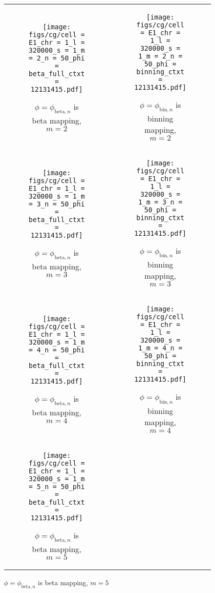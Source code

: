 \documentclass{article}
\def\bin{\text{bin}}
\def\bet{\text{beta}}
\begin{document}
\begin{figure}[H]
    \begin{tabular}{cc}
    \begin{subfigure}[t]{0.4\textwidth}
      \texttt{[image: figs/cg/cell = E1\_chr = 1\_l = 320000\_s = 1\_m = 2\_n = 50\_phi = beta\_full\_ctxt = 12131415.pdf]}
      \caption{$\phi = \phi_{\bet, n}$ is beta mapping, $m = 2$}
    \end{subfigure}
    &
    \begin{subfigure}[t]{0.4\textwidth}
      \texttt{[image: figs/cg/cell = E1\_chr = 1\_l = 320000\_s = 1\_m = 2\_n = 50\_phi = binning\_ctxt = 12131415.pdf]}
      \caption{$\phi = \phi_{\bin, n}$ is binning mapping, $m = 2$}
    \end{subfigure}
    \\
    \begin{subfigure}[t]{0.4\textwidth}
        \texttt{[image: figs/cg/cell = E1\_chr = 1\_l = 320000\_s = 1\_m = 3\_n = 50\_phi = beta\_full\_ctxt = 12131415.pdf]}
        \caption{$\phi = \phi_{\bet, n}$ is beta mapping, $m = 3$}
    \end{subfigure}
    &
    \begin{subfigure}[t]{0.4\textwidth}
        \texttt{[image: figs/cg/cell = E1\_chr = 1\_l = 320000\_s = 1\_m = 3\_n = 50\_phi = binning\_ctxt = 12131415.pdf]}
        \caption{$\phi = \phi_{\bin, n}$ is binning mapping, $m = 3$}
    \end{subfigure}
    \\
    \begin{subfigure}[t]{0.4\textwidth}
        \texttt{[image: figs/cg/cell = E1\_chr = 1\_l = 320000\_s = 1\_m = 4\_n = 50\_phi = beta\_full\_ctxt = 12131415.pdf]}
        \caption{$\phi = \phi_{\bet, n}$ is beta mapping, $m = 4$}
    \end{subfigure}
    &
    \begin{subfigure}[t]{0.4\textwidth}
        \texttt{[image: figs/cg/cell = E1\_chr = 1\_l = 320000\_s = 1\_m = 4\_n = 50\_phi = binning\_ctxt = 12131415.pdf]}
        \caption{$\phi = \phi_{\bin, n}$ is binning mapping, $m = 4$}
    \end{subfigure}
    \\
    \begin{subfigure}[t]{0.4\textwidth}
        \texttt{[image: figs/cg/cell = E1\_chr = 1\_l = 320000\_s = 1\_m = 5\_n = 50\_phi = beta\_full\_ctxt = 12131415.pdf]}
        \caption{$\phi = \phi_{\bet, n}$ is beta mapping, $m = 5$}

\end{subfigure}
\end{tabular}
\end{figure}
\end{document}
